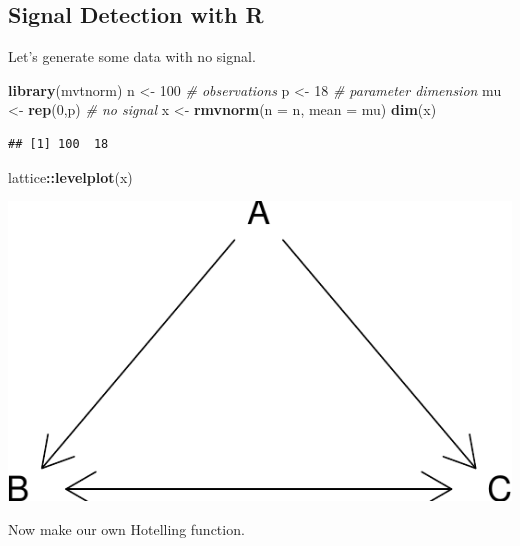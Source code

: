 \documentclass[]{book}
\newenvironment{Shaded}{\begin{snugshade}}{\end{snugshade}}
\newcommand{\CommentTok}[1]{\textcolor[rgb]{0.56,0.35,0.01}{\textit{#1}}}
\newcommand{\DataTypeTok}[1]{\textcolor[rgb]{0.13,0.29,0.53}{#1}}
\newcommand{\DecValTok}[1]{\textcolor[rgb]{0.00,0.00,0.81}{#1}}
\newcommand{\KeywordTok}[1]{\textcolor[rgb]{0.13,0.29,0.53}{\textbf{#1}}}
\newcommand{\NormalTok}[1]{#1}
\newcommand{\OperatorTok}[1]{\textcolor[rgb]{0.81,0.36,0.00}{\textbf{#1}}}
\newcommand{\StringTok}[1]{\textcolor[rgb]{0.31,0.60,0.02}{#1}}
\theoremstyle{definition}
\theoremstyle{definition}
\theoremstyle{definition}
\theoremstyle{remark}
\begin{document}
\hypertarget{signal-detection-with-r}{%
\subsection{Signal Detection with R}\label{signal-detection-with-r}}

Let's generate some data with no signal.

\begin{Shaded}
\begin{Highlighting}[]
\KeywordTok{library}\NormalTok{(mvtnorm)}
\NormalTok{n <-}\StringTok{ }\DecValTok{100} \CommentTok{# observations}
\NormalTok{p <-}\StringTok{ }\DecValTok{18} \CommentTok{# parameter dimension}
\NormalTok{mu <-}\StringTok{ }\KeywordTok{rep}\NormalTok{(}\DecValTok{0}\NormalTok{,p) }\CommentTok{# no signal}
\NormalTok{x <-}\StringTok{ }\KeywordTok{rmvnorm}\NormalTok{(}\DataTypeTok{n =}\NormalTok{ n, }\DataTypeTok{mean =}\NormalTok{ mu)}
\KeywordTok{dim}\NormalTok{(x)}
\end{Highlighting}
\end{Shaded}

\begin{verbatim}
## [1] 100  18
\end{verbatim}

\begin{Shaded}
\begin{Highlighting}[]
\NormalTok{lattice}\OperatorTok{::}\KeywordTok{levelplot}\NormalTok{(x)}
\end{Highlighting}
\end{Shaded}

\includegraphics[width=0.5\linewidth]{Rcourse_files/figure-latex/unnamed-chunk-222-1}

Now make our own Hotelling function.
\end{document}
